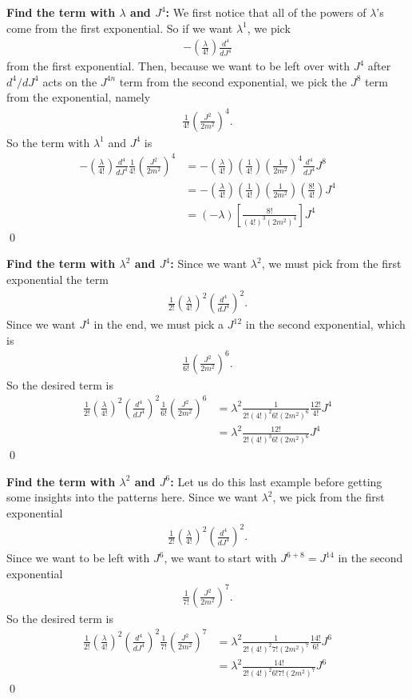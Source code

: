 \documentclass{book}
\theoremstyle{definition}
\newcommand{\f}[2]{\frac{#1}{#2}}
\newcommand{\lp}{\left(}
\newcommand{\rp}{\right)}
\newcommand{\lb}{\left[}
\newcommand{\rb}{\right]}
\begin{document}
\textbf{Find the term with $\lambda$ and $J^4$:} We first notice that all of the powers of $\lambda$'s come from the first exponential. So if we want $\lambda^1$, we pick
\begin{align}
- \lp\f{\lambda}{4!}\rp \f{d^4}{dJ^4} 
\end{align}
from the first exponential. Then, because we want to be left over with $J^4$ after $d^4/dJ^4$ acts on the $J^{4n}$ term from the second exponential, we pick the $J^8$ term from the exponential, namely
\begin{align}
\f{1}{4!}\lp \f{J^2}{2m^2} \rp^4.
\end{align}
So the term with $\lambda^1$ and $J^4$ is 
\begin{align}
- \lp\f{\lambda}{4!}\rp \f{d^4}{dJ^4} \f{1}{4!}\lp \f{J^2}{2m^2} \rp^4 &= -\lp\f{\lambda}{4!}\rp \lp\f{1}{4!}\rp \lp \f{1}{2m^2} \rp^4 \f{d^4}{dJ^4}J^8\\
&=  -\lp\f{\lambda}{4!}\rp \lp\f{1}{4!}\rp \lp \f{1}{2m^2}\rp \lp\f{8!}{4!}\rp J^4\\
&= \boxed{(-\lambda)\lb\f{8!}{(4!)^3 (2m^2)^4}\rb J^4}
\end{align}\qed


\textbf{Find the term with $\lambda^2$ and $J^4$:} Since we want $\lambda^2$, we must pick from the first exponential the term
\begin{align}
\f{1}{2!}\lp \f{\lambda}{4!} \rp^2\lp \f{d^4}{dJ^4} \rp^2.
\end{align}
Since we want $J^4$ in the end, we must pick a $J^{12}$ in the second exponential, which is
\begin{align}
\f{1}{6!}\lp \f{J^2}{2m^2} \rp^6.
\end{align}
So the desired term is 
\begin{align}
\f{1}{2!}\lp \f{\lambda}{4!} \rp^2\lp \f{d^4}{dJ^4} \rp^2 \f{1}{6!}\lp \f{J^2}{2m^2} \rp^6 &= \lambda^2 \f{1}{2!(4!)^2 6! (2m^2)^6}\f{12!}{4!}J^4 \\
&= \boxed{\lambda^2 \f{12!}{2! (4!)^3 6! (2m^2)^6 } J^4 }
\end{align}\qed


\textbf{Find the term with $\lambda^2$ and $J^6$:} Let us do this last example before getting some insights into the patterns here. Since we want $\lambda^2$, we pick from the first exponential
\begin{align}
\f{1}{2!}\lp \f{\lambda}{4!} \rp^2\lp \f{d^4}{dJ^4} \rp^2.
\end{align}
Since we want to be left with $J^6$, we want to start with $J^{6+8} = J^{14}$ in the second exponential
\begin{align}
\f{1}{7!}\lp \f{J^2}{2m^2} \rp^7.
\end{align}
So the desired term is 
\begin{align}
\f{1}{2!}\lp \f{\lambda}{4!} \rp^2  \lp \f{d^4}{dJ^4} \rp^2  \f{1}{7!}\lp \f{J^2}{2m^2} \rp^7 &= \lambda^2 \f{1}{2!(4!)^2 7! (2m^2)^7}\f{14!}{6!}J^6 \\
&= \boxed{\lambda^2 \f{14!}{2! (4!)^2 6! 7! (2m^2)^7 } J^6 }
\end{align}\qed
\end{document}
